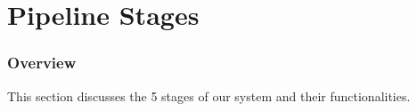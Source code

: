 \documentclass[12pt]{report}
\begin{document}




\part{Pipeline Stages}

\section{Overview}
This section discusses the 5 stages of our system and their functionalities.
\end{document}
